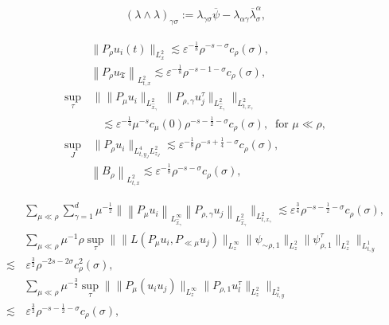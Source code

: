 \documentclass[10pt,a4paper]{amsart}
\begin{document}
\begin{align}
   (\lambda\wedge\lambda)_{\gamma\sigma}:= \lambda_{\gamma\sigma}\overline\psi
-
\lambda_{\alpha\gamma}
\overline{\lambda}^\alpha_{\sigma}, \label{wed.lam}
\end{align}

\begin{align}
	&\|P_{\rho} u_i(t) \|_{L^2_x} \lesssim  \varepsilon^{-\frac18}\rho^{-s-\sigma} c_\rho (\sigma),\label{sup1}\\
	&\left\|P_{\rho }  u_{\mathfrak{T}}\right\|_{L^2_{t,x } }\lesssim   \varepsilon^{-\frac 18} \rho^{-s-1-\sigma} c_\rho(\sigma),\label{supV} \\
	\sup_{\tau}&\,  \big\| \|P_\mu u_i\|_{L^2_{\widehat{x}_\gamma}}   \  \| P_{\rho,\gamma} u_j^\tau\|_{L^2_{\widehat{x}_\gamma}}  \big\|_{L^2_{t,x_\gamma}} \label{sup2} \\
 &\quad \lesssim \varepsilon^{-\frac14} \mu^{-s} c_\mu(0)   \rho^{-s-\frac 12-\sigma} c_\rho(\sigma), ~	\text{ for } \mu\ll \rho,\nonumber\\
			\sup_J &\, \|  P_\rho u_i \|_{L^4_{t,y_J} L^2_{z_J}}  \lesssim \varepsilon^{-\frac18} \rho^{-s+\frac 14-\sigma} c_\rho(\sigma), \label{sup3}\\
	&\left\|  B_{\rho }\right\|_{L^2_{t,x } }\lesssim  \varepsilon^{-\frac 18} \rho^{-s-\sigma} c_\rho(\sigma)\label{supB2},
\end{align}

    \begin{align}
        &  \sum_{\mu\ll \rho}  \sum_{\gamma=1}^d \mu^{-\frac 12} \big\| \left\|P_{\mu } u_i\right\|_{L^\infty_{\widehat{x}_\gamma}} \left\|P_{  \rho,\gamma}    u_j\right\|_{L^2_{\widehat{x}_\gamma}}\big\|_{L^2_{t,x_\gamma}} \lesssim  
 \varepsilon^{\frac 34}     \rho^{-s-\frac12-\sigma} c_{\rho} (\sigma), \label{pre.bi1}\\
 & \sum_{\mu \ll \rho} \mu^{-1} \rho \sup_\tau\Big\| \|    	L(P_{ \mu} u_i, P_{\ll \mu }u_j)  \|_{L^\infty_z} \|    \psi_{\sim \rho,1} \|_{L^2_z}   \|     \psi _{\rho,1}^\tau\|_{L^2_z}     \Big\|_{L^1_{t,y}}   \nonumber  \\
 \lesssim&\, \varepsilon^{\frac32}    \rho^{-2s  -2\sigma}c_{\rho }^2 (\sigma), \label{pre.bi2} \\
 & \sum_{\mu \ll \rho} \mu^{-\frac 32} \sup_\tau  \Big\| \|    	 P_{  \mu } (u_i u_j) \|_{L^\infty_z} \|   P_{ \rho,1} u_l^\tau \|_{L^2_z}     \Big\|_{L^2_{t,y}}   \nonumber  \\
 \lesssim&\, \varepsilon^{\frac 32} \rho^{-s-\frac12-\sigma} c_\rho(\sigma), \label{pre.bi3} 
    \end{align}
\end{document}
